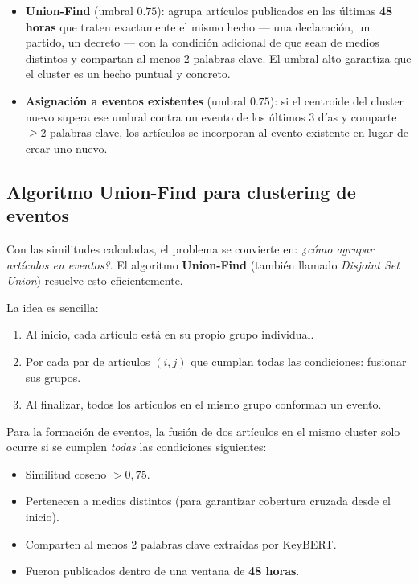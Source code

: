 \documentclass[12pt,a4paper]{article}
\begin{document}
\begin{itemize}[nosep]
  \item \textbf{Union-Find} (umbral $\mathbf{0.75}$): agrupa artículos publicados en las últimas \textbf{48 horas} que traten exactamente el mismo hecho --- una declaración, un partido, un decreto --- con la condición adicional de que sean de medios distintos y compartan al menos 2 palabras clave. El umbral alto garantiza que el cluster es un hecho puntual y concreto.
  \item \textbf{Asignación a eventos existentes} (umbral $\mathbf{0.75}$): si el centroide del cluster nuevo supera ese umbral contra un evento de los últimos 3 días y comparte $\geq$2 palabras clave, los artículos se incorporan al evento existente en lugar de crear uno nuevo.
\end{itemize}

\subsection{Algoritmo Union-Find para clustering de eventos}

Con las similitudes calculadas, el problema se convierte en: \textit{¿cómo agrupar artículos en eventos?}. El algoritmo \textbf{Union-Find} (también llamado \textit{Disjoint Set Union}) resuelve esto eficientemente.

La idea es sencilla:
\begin{enumerate}[nosep]
  \item Al inicio, cada artículo está en su propio grupo individual.
  \item Por cada par de artículos $(i, j)$ que cumplan todas las condiciones: fusionar sus grupos.
  \item Al finalizar, todos los artículos en el mismo grupo conforman un evento.
\end{enumerate}

Para la formación de eventos, la fusión de dos artículos en el mismo cluster solo ocurre si se cumplen \textit{todas} las condiciones siguientes:

\begin{itemize}[nosep]
  \item Similitud coseno $> 0{,}75$.
  \item Pertenecen a medios distintos (para garantizar cobertura cruzada desde el inicio).
  \item Comparten al menos 2 palabras clave extraídas por KeyBERT.
  \item Fueron publicados dentro de una ventana de \textbf{48 horas}.
\end{itemize}
\end{document}
